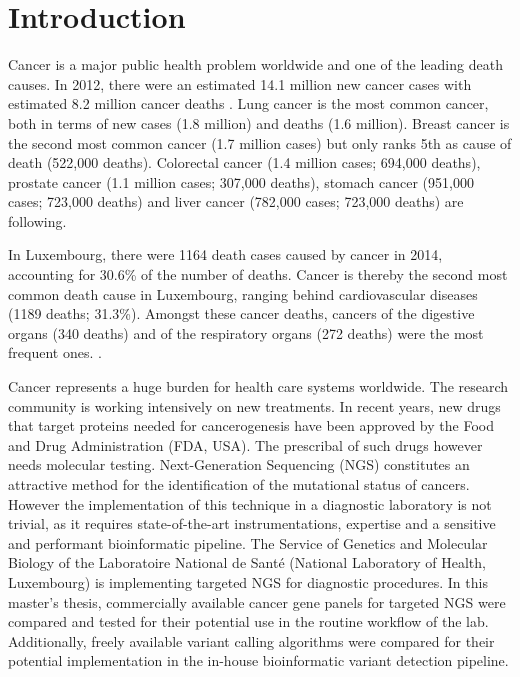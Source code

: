 \section{Introduction}

Cancer is a major public health problem worldwide and one of the leading death
causes. In 2012, there were an estimated 14.1 million new cancer cases with
estimated  8.2 million cancer deaths {\cite{cancer_stats_worldwide:2012}}. Lung
cancer is the most common cancer, both in terms of new cases (1.8 million) and
deaths (1.6 million). Breast  cancer is the second most common cancer (1.7
million cases) but only ranks 5th as cause of death (522,000 deaths). Colorectal
cancer (1.4 million cases; 694,000 deaths), prostate cancer (1.1 million cases;
307,000 deaths), stomach cancer (951,000 cases; 723,000 deaths) and liver cancer
(782,000 cases; 723,000 deaths) are following.

In Luxembourg, there were 1164 death cases caused by cancer in 2014, accounting
for 30.6\%  of the number of deaths. Cancer is thereby the second most common
death cause in Luxembourg, ranging behind cardiovascular diseases (1189 deaths;
31.3\%). Amongst these cancer deaths, cancers of the digestive organs (340 deaths)
and of the respiratory organs (272 deaths) were the most frequent ones.
{\cite{cancer_stats:2012}}.

Cancer represents a huge burden for health care systems worldwide. The research
community is working intensively on new treatments. In recent years, new drugs
that target proteins needed for cancerogenesis have been approved by the Food
and Drug Administration (FDA, USA). The prescribal of such drugs however needs
molecular testing. Next-Generation Sequencing (NGS) constitutes an attractive
method for the identification of the mutational status of cancers. However the
implementation of this technique  in a diagnostic laboratory is not trivial, as
it requires state-of-the-art instrumentations, expertise and a sensitive and
performant bioinformatic pipeline. The Service of Genetics and Molecular Biology
of the Laboratoire National de Santé (National Laboratory of Health, Luxembourg)
is implementing targeted NGS for diagnostic procedures.  In this master's
thesis, commercially available cancer gene panels for targeted NGS were compared
and tested for their potential use in the routine workflow of the lab.
Additionally, freely available variant calling algorithms were compared for
their potential implementation in the in-house bioinformatic variant detection
pipeline.

